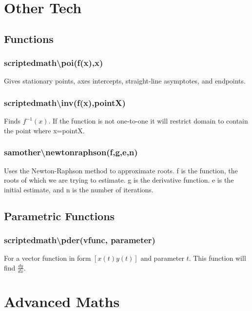 \documentclass[a4paper,twoside,10pt]{article}
\begin{document}
	\section{Other Tech}
		\subsection{Functions}
			\subsubsection{scriptedmath\textbackslash poi(f(x),x)} Gives stationary points, axes intercepts, straight-line asymptotes, and endpoints.
			\subsubsection{scriptedmath\textbackslash inv(f(x),pointX)} Finds $f^{-1}(x)$. If the function is not one-to-one it will restrict domain to contain the point where x=pointX.
			\subsubsection{sam\textunderscore other\textbackslash newtonraphson(f,g,e,n)} Uses the Newton-Raphson method to approximate roots. f is the function, the roots of which we are trying to estimate. g is the derivative function. e is the initial estimate, and n is the number of iterations.
		\subsection{Parametric Functions}
			\subsubsection{scriptedmath\textbackslash pder(vfunc, parameter)} For a vector function in form $[x(t) y(t)]$ and parameter $t$. This function will find $\frac{dy}{dx}$.
	\section{Advanced Maths}
\end{document}
